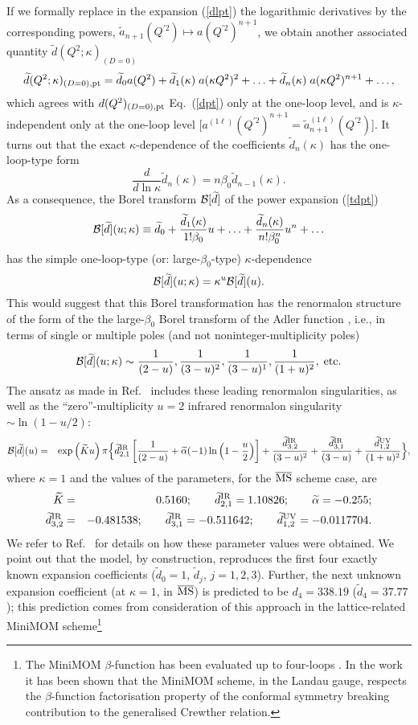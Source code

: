 \documentclass[aps,nofootinbib,showkeys,noshowpacs,preprintnumbers,amsmath,amssymb]{revtex4}
\def\be{\begin{equation}}
\def\ee{\end{equation}}
\def\bea{\begin{eqnarray}}
\def\eea{\end{eqnarray}}
\newcommand{\tK}{{\widetilde K}}
\newcommand{\ta}{{\widetilde a}}
\newcommand{\tal}{{\widetilde \alpha}}
\newcommand{\td}{{\widetilde d}}
\newcommand{\MSbar}{\overline{\rm MS}}
\begin{document}
If we formally replace in the expansion (\ref{dlpt}) the logarithmic derivatives by the corresponding powers, ${\ta}_{n+1}(Q^{'2}) \mapsto a(Q^{'2})^{n+1}$, we obtain another associated quantity ${\td}(Q^2;\kappa)_{(D=0)}$
\be
{\td}(Q^2;\kappa)_{(D=0), {\rm pt}} = {\td}_0 a(Q^2) + {\td}_1(\kappa) \; a(\kappa Q^2)^2 + \ldots + {\td}_n(\kappa) \; a(\kappa Q^2)^{n+1} + \ldots,
\label{tdpt} \ee
which agrees with $d(Q^2)_{(D=0), {\rm pt}}$ Eq.~(\ref{dpt}) only at the one-loop level, and is $\kappa$-independent only at the one-loop level [$a^{(1 \ell)}(Q^{'2})^{n+1} = {\ta}^{(1 \ell)}_{n+1}(Q^{'2})$]. It turns out that the exact $\kappa$-dependence of the coefficients ${\td}_n(\kappa)$ has the one-loop-type form
\be
\frac{d}{d \ln \kappa} {\td}_n(\kappa) = n \beta_0 {\td}_{n-1}(\kappa).
\label{tdnkap} \ee
As a consequence, the Borel transform ${\cal B}[\td]$ of the power expansion (\ref{tdpt})
\be
{\cal B}[\td](u; \kappa) \equiv {\td}_0 + \frac{{\td}_1(\kappa)}{1! \beta_0} u + \ldots + \frac{{\td}_n(\kappa)}{n! \beta_0^n} u^n + \ldots
\label{Btdexp} \ee
has the simple one-loop-type (or: large-$\beta_0$-type) $\kappa$-dependence
\be
{\cal B}[\td](u; \kappa) = \kappa^u {\cal B}[\td](u).
\label{Btdkappa} \ee
This would suggest that this Borel transformation has the renormalon structure of the form of the the large-$\beta_0$ Borel transform of the Adler function , i.e., in terms of single or multiple poles (and not noninteger-multiplicity poles)\be
{\cal B}[\td](u; \kappa) \sim \frac{1}{(2-u)}, \frac{1}{(3-u)^2},  \frac{1}{(3-u)^1}, \frac{1}{(1+u)^2}, \; {\rm etc.}
\label{Btdstr} \ee
The ansatz as made in Ref.~\cite{renmod} includes these leading renormalon singularities, as well as the ``zero''-multiplicity $u=2$ infrared renormalon singularity $\sim \ln(1 - u/2)$:
\bea
{\cal B}[\td](u) & = & \exp \left( \tK u \right) \pi {\Big \{}
\td_{2,1}^{\rm IR} \left[ \frac{1}{(2-u)} + \tal (-1) \ln \left( 1 - \frac{u}{2} \right) \right] + \frac{ \td_{3,2}^{\rm IR} }{(3 - u)^2} + \frac{ \td_{3,1}^{\rm IR} }{(3 - u)} + \frac{ \td_{1,2}^{\rm UV} }{(1 + u)^2} {\Big \}},
\label{Btd5P}
\eea
where $\kappa=1$ and the values of the parameters, for the $\MSbar$ scheme case, are
\bea
\tK &=& 0.5160; \qquad \td_{2,1}^{\rm IR}=1.10826; \qquad {\widetilde \alpha}=-0.255;
\nonumber\\
\td_{3,2}^{\rm IR}&=&-0.481538; \qquad \td_{3,1}^{\rm IR}=-0.511642; \qquad
\td_{1,2}^{\rm UV}=-0.0117704.
\label{paramrenmod}
\eea
We refer to Ref.~\cite{renmod} for details on how these parameter values were obtained. We point out that the model, by construction, reproduces the first four exactly known expansion coefficients (${\td}_0=1$, ${\td}_j$, $j=1,2,3$). Further, the next unknown expansion coefficient (at $\kappa=1$, in $\MSbar$) is predicted to be $d_4=338.19$ ($\td_4=37.77$); this prediction comes from consideration of this approach in the lattice-related MiniMOM scheme\footnote{The MiniMOM $\beta$-function has been evaluated up to four-loops \cite{MiniMOM,BoucaudMM,CheRet}. In the work \cite{AKGCR} it has been shown that the MiniMOM scheme, in the Landau gauge, respects the $\beta$-function factorisation property of the conformal symmetry breaking contribution to the generalised Crewther relation.}
\end{document}
